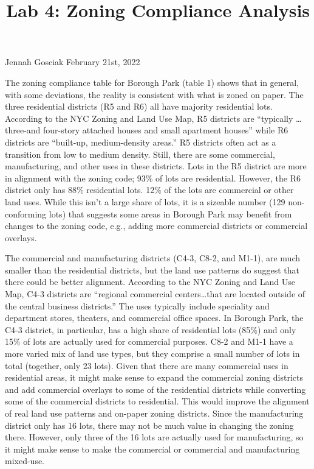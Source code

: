 \documentclass[
  11pt,
  landscape]{article}
\title{Lab 4: Zoning Compliance Analysis}
\author{}
\date{\vspace{-2.5em}}
\begin{document}
\maketitle

\vspace{-2.2cm}
\raggedright

Jennah Gosciak \newline February 21st, 2022 \newline

\onehalfspacing

The zoning compliance table for Borough Park (table 1) shows that in
general, with some deviations, the reality is consistent with what is
zoned on paper. The three residential districts (R5 and R6) all have
majority residential lots. According to the NYC Zoning and Land Use Map,
R5 districts are ``typically \ldots three-and four-story attached houses
and small apartment houses'' while R6 districts are ``built-up,
medium-density areas.'' R5 districts often act as a transition from low
to medium density. Still, there are some commercial, manufacturing, and
other uses in these districts. Lots in the R5 district are more in
alignment with the zoning code; 93\% of lots are residential. However,
the R6 district only has 88\% residential lots. 12\% of the lots are
commercial or other land uses. While this isn't a large share of lots,
it is a sizeable number (129 non-conforming lots) that suggests some
areas in Borough Park may benefit from changes to the zoning code, e.g.,
adding more commercial districts or commercial overlays.

The commercial and manufacturing districts (C4-3, C8-2, and M1-1), are
much smaller than the residential districts, but the land use patterns
do suggest that there could be better alignment. According to the NYC
Zoning and Land Use Map, C4-3 districts are ``regional commercial
centers\ldots that are located outside of the central business
districts.'' The uses typically include speciality and department
stores, theaters, and commercial office spaces. In Borough Park, the
C4-3 district, in particular, has a high share of residential lots
(85\%) and only 15\% of lots are actually used for commercial purposes.
C8-2 and M1-1 have a more varied mix of land use types, but they
comprise a small number of lots in total (together, only 23 lots). Given
that there are many commercial uses in residential areas, it might make
sense to expand the commercial zoning districts and add commercial
overlays to some of the residential districts while converting some of
the commercial districts to residential. This would improve the
alignment of real land use patterns and on-paper zoning districts. Since
the manufacturing district only has 16 lots, there may not be much value
in changing the zoning there. However, only three of the 16 lots are
actually used for manufacturing, so it might make sense to make the
commercial or commercial and manufacturing mixed-use.
\end{document}
